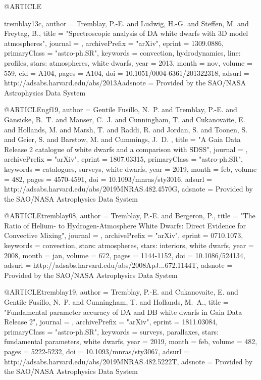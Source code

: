 \documentclass[a4paper,fleqn,usenatbib]{mnras}
\begin{document}
{{{{{{{{{@ARTICLE{tremblay13c,
   author = {{Tremblay}, P.-E. and {Ludwig}, H.-G. and {Steffen}, M. and 
	{Freytag}, B.},
    title = "{Spectroscopic analysis of DA white dwarfs with 3D model atmospheres}",
  journal = {\aap},
archivePrefix = "arXiv",
   eprint = {1309.0886},
 primaryClass = "astro-ph.SR",
 keywords = {convection, hydrodynamics, line: profiles, stars: atmospheres, white dwarfs},
     year = 2013,
    month = nov,
   volume = 559,
      eid = {A104},
    pages = {A104},
      doi = {10.1051/0004-6361/201322318},
   adsurl = {http://adsabs.harvard.edu/abs/2013Aadsnote = {Provided by the SAO/NASA Astrophysics Data System}
}





@ARTICLE{ngf19,
   author = {{Gentile Fusillo}, N.~P. and {Tremblay}, P.-E. and {G{\"a}nsicke}, B.~T. and 
	{Manser}, C.~J. and {Cunningham}, T. and {Cukanovaite}, E. and 
	{Hollands}, M. and {Marsh}, T. and {Raddi}, R. and {Jordan}, S. and 
	{Toonen}, S. and {Geier}, S. and {Barstow}, M. and {Cummings}, J.~D.
	},
    title = "{A Gaia Data Release 2 catalogue of white dwarfs and a comparison with SDSS}",
  journal = {\mnras},
archivePrefix = "arXiv",
   eprint = {1807.03315},
 primaryClass = "astro-ph.SR",
 keywords = {catalogues, surveys, white dwarfs},
     year = 2019,
    month = feb,
   volume = 482,
    pages = {4570-4591},
      doi = {10.1093/mnras/sty3016},
   adsurl = {http://adsabs.harvard.edu/abs/2019MNRAS.482.4570G},
  adsnote = {Provided by the SAO/NASA Astrophysics Data System}
}

@ARTICLE{tremblay08,
   author = {{Tremblay}, P.-E. and {Bergeron}, P.},
    title = "{The Ratio of Helium- to Hydrogen-Atmosphere White Dwarfs: Direct Evidence for Convective Mixing}",
  journal = {\apj},
archivePrefix = "arXiv",
   eprint = {0710.1073},
 keywords = {convection, stars: atmospheres, stars: interiors, white dwarfs},
     year = 2008,
    month = jan,
   volume = 672,
    pages = {1144-1152},
      doi = {10.1086/524134},
   adsurl = {http://adsabs.harvard.edu/abs/2008ApJ...672.1144T},
  adsnote = {Provided by the SAO/NASA Astrophysics Data System}
}



@ARTICLE{tremblay19,
   author = {{Tremblay}, P.-E. and {Cukanovaite}, E. and {Gentile Fusillo}, N.~P. and 
	{Cunningham}, T. and {Hollands}, M.~A.},
    title = "{Fundamental parameter accuracy of DA and DB white dwarfs in Gaia Data Release 2}",
  journal = {\mnras},
archivePrefix = "arXiv",
   eprint = {1811.03084},
 primaryClass = "astro-ph.SR",
 keywords = {surveys, parallaxes, stars: fundamental parameters, white dwarfs},
     year = 2019,
    month = feb,
   volume = 482,
    pages = {5222-5232},
      doi = {10.1093/mnras/sty3067},
   adsurl = {http://adsabs.harvard.edu/abs/2019MNRAS.482.5222T},
  adsnote = {Provided by the SAO/NASA Astrophysics Data System}
}



}}}}}}}}}}
\end{document}
